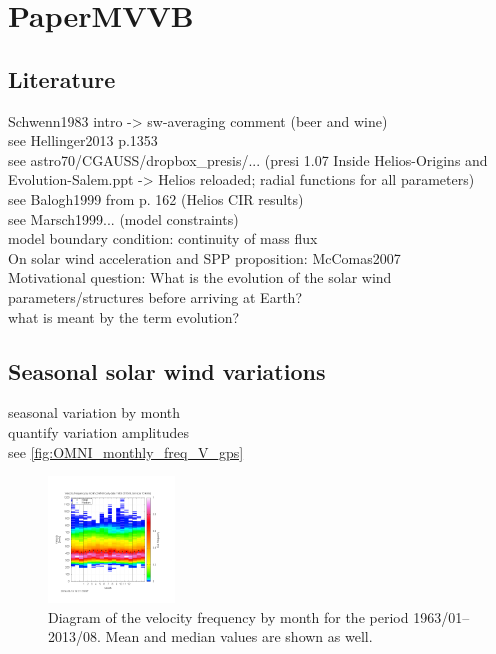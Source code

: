 \chapter{PaperMVVB}



\section{Literature}
Schwenn1983 intro -> sw-averaging comment (beer and wine)\\
see Hellinger2013 p.1353\\
see astro70/CGAUSS/dropbox\_presis/... (presi 1.07 Inside Helios-Origins and Evolution-Salem.ppt -> Helios reloaded; radial functions for all parameters)\\
see Balogh1999 from p. 162 (Helios CIR results)\\
see Marsch1999... (model constraints)\\
model boundary condition: continuity of mass flux\\
On solar wind acceleration and SPP proposition: McComas2007\\

Motivational question: What is the evolution of the solar wind parameters/structures before arriving at Earth?\\
what is meant by the term evolution?\\


\section{Seasonal solar wind variations}
seasonal variation by month\\
quantify variation amplitudes\\

see \autoref{fig:OMNI_monthly_freq_V_gps}
\begin{figure}[htb]
	\centering
	\includegraphics[width=0.3\textwidth]{images/gnuplots/OMNI_monthly_freq_V_gps.png}
	\caption{Diagram of the velocity frequency by month for the period 1963/01--2013/08. Mean and median values are shown as well.}
	\label{fig:OMNI_monthly_freq_V_gps}
\end{figure}

